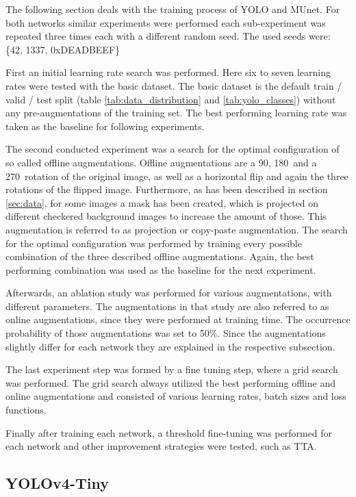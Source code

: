 \label{sec:training}

The following section deals with the training process of YOLO and \ac{MUnet}.
For both networks similar experiments were performed each sub-experiment was repeated three times each with a different random seed.
The used seeds were: \{42, 1337, 0xDEADBEEF\}

First an initial learning rate search was performed.
Here six to seven learning rates were tested with the basic dataset.
The basic dataset is the default train / valid / test split (table \ref{tab:data_distribution} and \ref{tab:yolo_classes}) without any pre-augmentations of the training set.
The best performing learning rate was taken as the baseline for following experiments.

The second conducted experiment was a search for the optimal configuration of so called offline augmentations.
Offline augmentations are a 90\textdegree, 180\textdegree\ and a 270\textdegree\  rotation of the original image, as well as a horizontal flip and again the three rotations of the flipped image.
Furthermore, as has been described in section \ref{sec:data}, for some images a mask has been created, which is projected on different checkered background images to increase the amount of those.
This augmentation is referred to as projection or copy-paste augmentation.
The search for the optimal configuration was performed by training every possible combination of the three described offline augmentations.
Again, the best performing combination was used as the baseline for the next experiment.

Afterwards, an ablation study was performed for various augmentations, with different parameters.
The augmentations in that study are also referred to as online augmentations, since they were performed at training time.
The occurrence probability of those augmentations was set to 50\%.
Since the augmentations slightly differ for each network they are explained in the respective subsection.

The last experiment step was formed by a fine tuning step, where a grid search was performed.
The grid search always utilized the best performing offline and online augmentations and consisted of various learning rates, batch sizes and loss functions.

Finally after training each network, a threshold fine-tuning was performed for each network and other improvement strategies were tested, such as \ac{TTA}.

\subsection{YOLOv4-Tiny}


